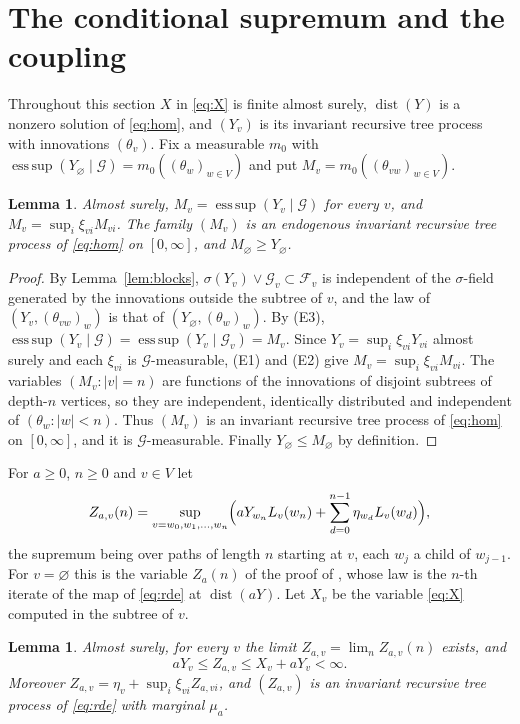 \documentclass[11pt]{amsart}
\newtheorem{lemma}[theorem]{Lemma}
\theoremstyle{remark}
\newcommand{\Ga}{\mathcal{G}}
\newcommand{\cF}{\mathcal{F}}
\newcommand{\esssup}{\operatorname*{ess\,sup}}
\newcommand{\dist}{\operatorname{dist}}
\begin{document}
\section{The conditional supremum and the coupling}\label{sec:proof}

Throughout this section $X$ in \eqref{eq:X} is finite almost surely, $\dist(Y)$ is a
nonzero solution of \eqref{eq:hom}, and $(Y_v)$ is its invariant recursive tree process
with innovations $(\theta_v)$. Fix a measurable $m_0$ with
$\esssup(Y_\varnothing\mid\Ga)=m_0((\theta_w)_{w\in V})$ and put
$M_v=m_0((\theta_{vw})_{w\in V})$.

\begin{lemma}\label{lem:M}
Almost surely, $M_v=\esssup(Y_v\mid\Ga)$ for every $v$, and
$M_v=\sup_i\xi_{vi}M_{vi}$. The family $(M_v)$ is an endogenous invariant recursive tree
process of \eqref{eq:hom} on $[0,\infty]$, and $M_\varnothing\ge Y_\varnothing$.
\end{lemma}

\begin{proof}
By Lemma~\ref{lem:blocks}, $\sigma(Y_v)\vee\Ga_v\subset\cF_v$ is independent of the
$\sigma$-field generated by the innovations outside the subtree of $v$, and the law of
$(Y_v,(\theta_{vw})_w)$ is that of $(Y_\varnothing,(\theta_w)_w)$. By (E3),
$\esssup(Y_v\mid\Ga)=\esssup(Y_v\mid\Ga_v)=M_v$. Since
$Y_v=\sup_i\xi_{vi}Y_{vi}$ almost surely and each $\xi_{vi}$ is $\Ga$-measurable, (E1)
and (E2) give $M_v=\sup_i\xi_{vi}M_{vi}$. The variables $(M_v:|v|=n)$ are functions of
the innovations of disjoint subtrees of depth-$n$ vertices, so they are independent,
identically distributed and independent of $(\theta_w:|w|<n)$. Thus $(M_v)$ is an invariant
recursive tree process of \eqref{eq:hom} on $[0,\infty]$, and it is $\Ga$-measurable.
Finally $Y_\varnothing\le M_\varnothing$ by definition.
\end{proof}

For $a\ge0$, $n\ge 0$ and $v\in V$ let
\[
Z_{a,v}(n)=\sup_{v=w_0,w_1,\dots,w_n}\Bigl(aY_{w_n}L_v(w_n)+\sum_{d=0}^{n-1}\eta_{w_d}L_v(w_d)\Bigr),
\]
the supremum being over paths of length $n$ starting at $v$, each $w_{j}$ a child of
$w_{j-1}$. For $v=\varnothing$ this is the variable $Z_a(n)$ of the proof of
\cite[Corollary~33]{AB}, whose law is the $n$-th iterate of the map of \eqref{eq:rde} at
$\dist(aY)$. Let $X_v$ be the variable \eqref{eq:X} computed in the subtree of $v$.

\begin{lemma}\label{lem:coupling}
Almost surely, for every $v$ the limit $Z_{a,v}=\lim_n Z_{a,v}(n)$ exists, and
\begin{equation}\label{eq:sandwich}
aY_v\le Z_{a,v}\le X_v+aY_v<\infty .
\end{equation}
Moreover $Z_{a,v}=\eta_v+\sup_i\xi_{vi}Z_{a,vi}$, and $(Z_{a,v})$ is an invariant recursive
tree process of \eqref{eq:rde} with marginal $\mu_a$.
\end{lemma}
\end{document}
